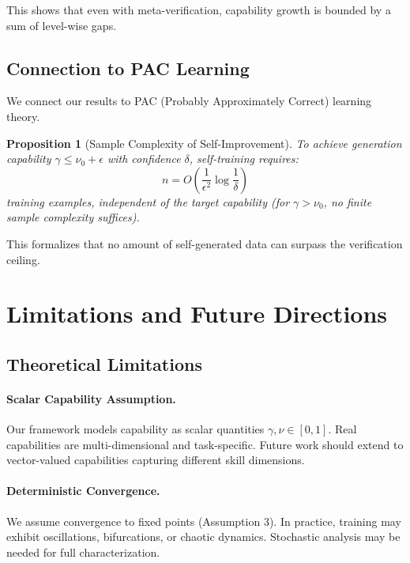 \documentclass{article}
\newtheorem{proposition}[theorem]{Proposition}
\theoremstyle{definition}
\theoremstyle{remark}
\begin{document}
This shows that even with meta-verification, capability growth is bounded by a sum of level-wise gaps.

\subsection{Connection to PAC Learning}

We connect our results to PAC (Probably Approximately Correct) learning theory.

\begin{proposition}[Sample Complexity of Self-Improvement]
\label{prop:sample-complexity}
To achieve generation capability \(\gamma \leq \nu_0 + \epsilon\) with confidence \(\delta\), self-training requires:
\[
n = O\left( \frac{1}{\epsilon^2} \log \frac{1}{\delta} \right)
\]
training examples, independent of the target capability (for \(\gamma > \nu_0\), no finite sample complexity suffices).
\end{proposition}

This formalizes that no amount of self-generated data can surpass the verification ceiling.

\section{Limitations and Future Directions}
\label{sec:limitations-future}

\subsection{Theoretical Limitations}

\paragraph{Scalar Capability Assumption.}
Our framework models capability as scalar quantities \(\gamma, \nu \in [0,1]\). Real capabilities are multi-dimensional and task-specific. Future work should extend to vector-valued capabilities capturing different skill dimensions.

\paragraph{Deterministic Convergence.}
We assume convergence to fixed points (Assumption 3). In practice, training may exhibit oscillations, bifurcations, or chaotic dynamics. Stochastic analysis may be needed for full characterization.
\end{document}
